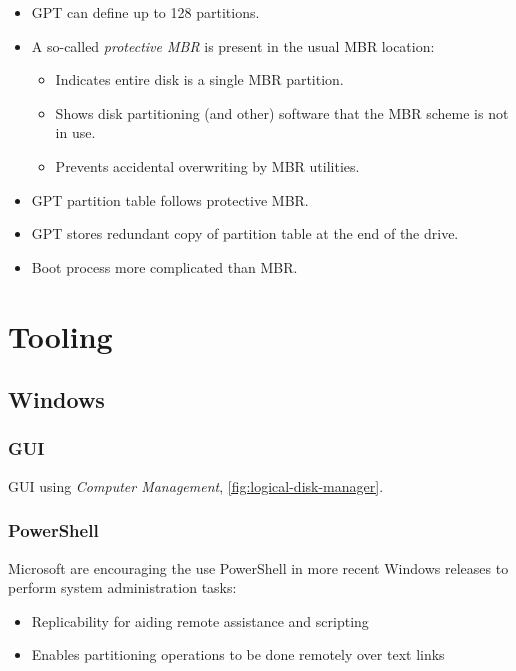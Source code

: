 \documentclass[slides]{pgnotes}
\begin{document}
\begin{itemize}
\item
  GPT can define up to 128 partitions.
\item
  A so-called \emph{protective MBR} is present in the usual MBR
  location:

  \begin{itemize}
  \item
    Indicates entire disk is a single MBR partition.
  \item
    Shows disk partitioning (and other) software that the MBR scheme is
    not in use.
  \item
    Prevents accidental overwriting by MBR utilities.
  \end{itemize}
\item
  GPT partition table follows protective MBR.
\item
  GPT stores redundant copy of partition table at the end of the drive.
\item
  Boot process more complicated than MBR.
\end{itemize}

\section{Tooling}

\subsection{Windows}

\subsubsection{GUI}

GUI using \textit{Computer Management}, \autoref{fig:logical-disk-manager}.


\subsubsection{PowerShell}

Microsoft are encouraging the use PowerShell in more recent Windows releases to perform system administration tasks:

\begin{itemize}
\item Replicability for aiding remote assistance and scripting
\item Enables partitioning operations to be done remotely over text links
\end{itemize}
\end{document}
